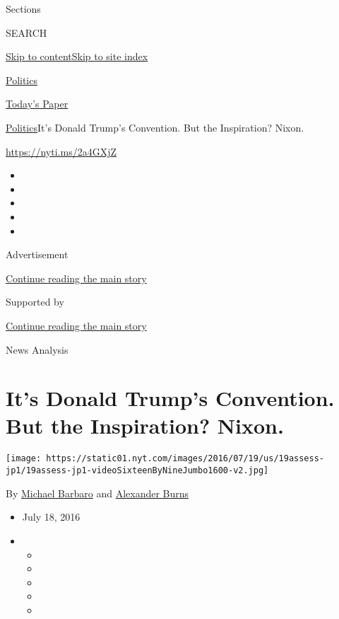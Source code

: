 Sections

SEARCH

\protect\hyperlink{site-content}{Skip to
content}\protect\hyperlink{site-index}{Skip to site index}

\href{https://www.nytimes.com/section/politics}{Politics}

\href{https://myaccount.nytimes.com/auth/login?response_type=cookie\&client_id=vi}{}

\href{https://www.nytimes.com/section/todayspaper}{Today's Paper}

\href{/section/politics}{Politics}\textbar{}It's Donald Trump's
Convention. But the Inspiration? Nixon.

\url{https://nyti.ms/2a4GXjZ}

\begin{itemize}
\item
\item
\item
\item
\item
\end{itemize}

Advertisement

\protect\hyperlink{after-top}{Continue reading the main story}

Supported by

\protect\hyperlink{after-sponsor}{Continue reading the main story}

News Analysis

\hypertarget{its-donald-trumps-convention-but-the-inspiration-nixon}{%
\section{It's Donald Trump's Convention. But the Inspiration?
Nixon.}\label{its-donald-trumps-convention-but-the-inspiration-nixon}}

\texttt{[image: https://static01.nyt.com/images/2016/07/19/us/19assess-jp1/19assess-jp1-videoSixteenByNineJumbo1600-v2.jpg]}

By \href{http://www.nytimes.com/by/michael-barbaro}{Michael Barbaro} and
\href{http://www.nytimes.com/by/alexander-burns}{Alexander Burns}

\begin{itemize}
\item
  July 18, 2016
\item
  \begin{itemize}
  \item
  \item
  \item
  \item
  \item
  \end{itemize}
\end{itemize}

